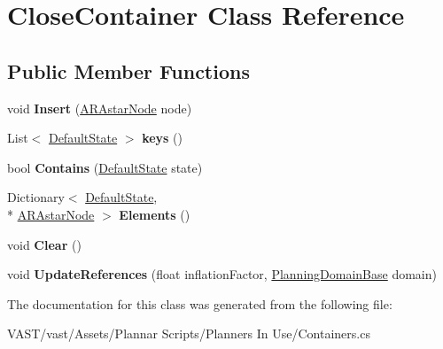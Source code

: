 \hypertarget{class_close_container}{\section{Close\-Container Class Reference}
\label{class_close_container}
}
\subsection*{Public Member Functions}
\begin{DoxyCompactItemize}
\item 
\hypertarget{class_close_container_a52aad3abda6bedf9ce5046cff5268c4b}{void {\bfseries Insert} (\hyperlink{class_a_r_astar_node}{A\-R\-Astar\-Node} node)}\label{class_close_container_a52aad3abda6bedf9ce5046cff5268c4b}

\item 
\hypertarget{class_close_container_a70df1c9c44b48239dec94bf34e3ddfcc}{List$<$ \hyperlink{class_default_state}{Default\-State} $>$ {\bfseries keys} ()}\label{class_close_container_a70df1c9c44b48239dec94bf34e3ddfcc}

\item 
\hypertarget{class_close_container_af3fed08a9636b657f8f59512861aa095}{bool {\bfseries Contains} (\hyperlink{class_default_state}{Default\-State} state)}\label{class_close_container_af3fed08a9636b657f8f59512861aa095}

\item 
\hypertarget{class_close_container_ac18391d6d973ff76bc10346a7b469257}{Dictionary$<$ \hyperlink{class_default_state}{Default\-State}, \\*
\hyperlink{class_a_r_astar_node}{A\-R\-Astar\-Node} $>$ {\bfseries Elements} ()}\label{class_close_container_ac18391d6d973ff76bc10346a7b469257}

\item 
\hypertarget{class_close_container_accb0cc8ad39d76277547978e7bbd5ffb}{void {\bfseries Clear} ()}\label{class_close_container_accb0cc8ad39d76277547978e7bbd5ffb}

\item 
\hypertarget{class_close_container_ac058e024cd9b0a16d62ea660b6991bcb}{void {\bfseries Update\-References} (float inflation\-Factor, \hyperlink{class_planning_domain_base}{Planning\-Domain\-Base} domain)}\label{class_close_container_ac058e024cd9b0a16d62ea660b6991bcb}

\end{DoxyCompactItemize}


The documentation for this class was generated from the following file\-:\begin{DoxyCompactItemize}
\item 
V\-A\-S\-T/vast/\-Assets/\-Plannar Scripts/\-Planners In Use/Containers.\-cs\end{DoxyCompactItemize}
